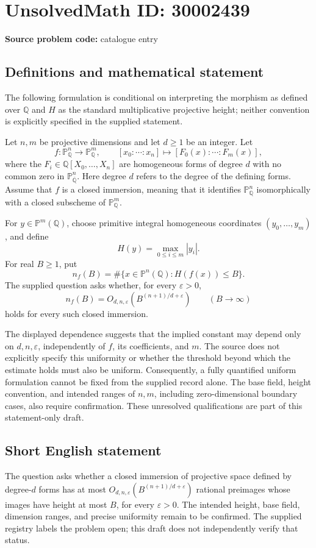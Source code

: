 \documentclass[11pt]{article}
\newcommand{\Q}{\mathbb{Q}}
\newcommand{\PP}{\mathbb{P}}
\begin{document}
\section*{UnsolvedMath ID: 30002439}
\textbf{Source problem code:} catalogue entry
\subsection{Definitions and mathematical statement}
The following formulation is conditional on interpreting the morphism as defined over \(\Q\) and \(H\) as the standard multiplicative projective height; neither convention is explicitly specified in the supplied statement.

Let \(n,m\) be projective dimensions and let \(d\geq 1\) be an integer. Let
\[
f:\PP^n_{\Q}\longrightarrow\PP^m_{\Q},\qquad
[x_0:\cdots:x_n]\longmapsto[F_0(x):\cdots:F_m(x)],
\]
where the \(F_i\in\Q[X_0,\ldots,X_n]\) are homogeneous forms of degree \(d\) with no common zero in \(\PP^n_{\overline{\Q}}\). Here degree \(d\) refers to the degree of the defining forms. Assume that \(f\) is a closed immersion, meaning that it identifies \(\PP^n_{\Q}\) isomorphically with a closed subscheme of \(\PP^m_{\Q}\).

For \(y\in\PP^m(\Q)\), choose primitive integral homogeneous coordinates \((y_0,\ldots,y_m)\), and define
\[
H(y)=\max_{0\leq i\leq m}|y_i|.
\]
For real \(B\geq1\), put
\[
n_f(B)=\#\{x\in\PP^n(\Q):H(f(x))\leq B\}.
\]
The supplied question asks whether, for every \(\varepsilon>0\),
\[
n_f(B)=O_{d,n,\varepsilon}\!\left(B^{(n+1)/d+\varepsilon}\right)
\qquad(B\longrightarrow\infty)
\]
holds for every such closed immersion.

The displayed dependence suggests that the implied constant may depend only on \(d,n,\varepsilon\), independently of \(f\), its coefficients, and \(m\). The source does not explicitly specify this uniformity or whether the threshold beyond which the estimate holds must also be uniform. Consequently, a fully quantified uniform formulation cannot be fixed from the supplied record alone. The base field, height convention, and intended ranges of \(n,m\), including zero-dimensional boundary cases, also require confirmation. These unresolved qualifications are part of this statement-only draft.
\subsection{Short English statement}
The question asks whether a closed immersion of projective space defined by degree-\(d\) forms has at most \(O_{d,n,\varepsilon}(B^{(n+1)/d+\varepsilon})\) rational preimages whose images have height at most \(B\), for every \(\varepsilon>0\). The intended height, base field, dimension ranges, and precise uniformity remain to be confirmed. The supplied registry labels the problem open; this draft does not independently verify that status.
\end{document}
